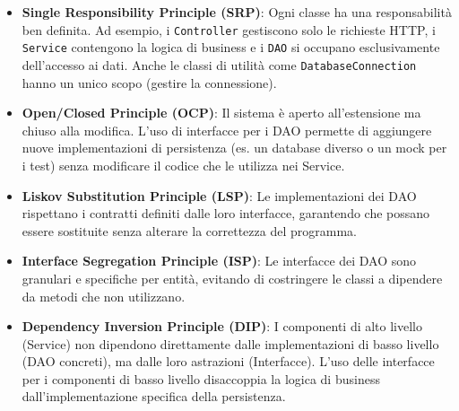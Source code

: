 \begin{itemize}
    \item \textbf{Single Responsibility Principle (SRP)}:
    Ogni classe ha una responsabilità ben definita. Ad esempio, i \texttt{Controller} gestiscono solo le richieste HTTP, 
    i \texttt{Service} contengono la logica di business e i \texttt{DAO} si occupano esclusivamente dell'accesso ai dati. 
    Anche le classi di utilità come \texttt{DatabaseConnection} hanno un unico scopo (gestire la connessione).
    
    \item \textbf{Open/Closed Principle (OCP)}:
    Il sistema è aperto all'estensione ma chiuso alla modifica. L'uso di interfacce per i DAO permette di aggiungere nuove implementazioni di persistenza 
    (es. un database diverso o un mock per i test) senza modificare il codice che le utilizza nei Service.
    
    \item \textbf{Liskov Substitution Principle (LSP)}:
    Le implementazioni dei DAO rispettano i contratti definiti dalle loro interfacce, garantendo che possano essere sostituite senza alterare la correttezza del programma.
    
    \item \textbf{Interface Segregation Principle (ISP)}:
    Le interfacce dei DAO sono granulari e specifiche per entità, evitando di costringere le classi a dipendere da metodi che non utilizzano.
    
    \item \textbf{Dependency Inversion Principle (DIP)}:
    I componenti di alto livello (Service) non dipendono direttamente dalle implementazioni di basso livello (DAO concreti), 
    ma dalle loro astrazioni (Interfacce). L'uso delle interfacce per i componenti di basso livello disaccoppia la logica di business dall'implementazione 
    specifica della persistenza.
\end{itemize}
